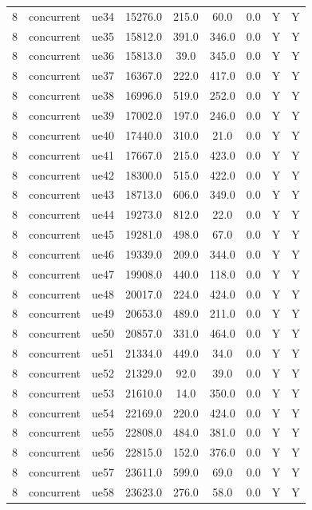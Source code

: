 \begin{table}[ht]
\begin{tabular}{|c|c|c|c|c|c|c|c|c|}
8 & concurrent & ue34 & 15276.0 & 215.0 & 60.0 & 0.0 & Y & Y \\
8 & concurrent & ue35 & 15812.0 & 391.0 & 346.0 & 0.0 & Y & Y \\
8 & concurrent & ue36 & 15813.0 & 39.0 & 345.0 & 0.0 & Y & Y \\
8 & concurrent & ue37 & 16367.0 & 222.0 & 417.0 & 0.0 & Y & Y \\
8 & concurrent & ue38 & 16996.0 & 519.0 & 252.0 & 0.0 & Y & Y \\
8 & concurrent & ue39 & 17002.0 & 197.0 & 246.0 & 0.0 & Y & Y \\
8 & concurrent & ue40 & 17440.0 & 310.0 & 21.0 & 0.0 & Y & Y \\
8 & concurrent & ue41 & 17667.0 & 215.0 & 423.0 & 0.0 & Y & Y \\
8 & concurrent & ue42 & 18300.0 & 515.0 & 422.0 & 0.0 & Y & Y \\
8 & concurrent & ue43 & 18713.0 & 606.0 & 349.0 & 0.0 & Y & Y \\
8 & concurrent & ue44 & 19273.0 & 812.0 & 22.0 & 0.0 & Y & Y \\
8 & concurrent & ue45 & 19281.0 & 498.0 & 67.0 & 0.0 & Y & Y \\
8 & concurrent & ue46 & 19339.0 & 209.0 & 344.0 & 0.0 & Y & Y \\
8 & concurrent & ue47 & 19908.0 & 440.0 & 118.0 & 0.0 & Y & Y \\
8 & concurrent & ue48 & 20017.0 & 224.0 & 424.0 & 0.0 & Y & Y \\
8 & concurrent & ue49 & 20653.0 & 489.0 & 211.0 & 0.0 & Y & Y \\
8 & concurrent & ue50 & 20857.0 & 331.0 & 464.0 & 0.0 & Y & Y \\
8 & concurrent & ue51 & 21334.0 & 449.0 & 34.0 & 0.0 & Y & Y \\
8 & concurrent & ue52 & 21329.0 & 92.0 & 39.0 & 0.0 & Y & Y \\
8 & concurrent & ue53 & 21610.0 & 14.0 & 350.0 & 0.0 & Y & Y \\
8 & concurrent & ue54 & 22169.0 & 220.0 & 424.0 & 0.0 & Y & Y \\
8 & concurrent & ue55 & 22808.0 & 484.0 & 381.0 & 0.0 & Y & Y \\
8 & concurrent & ue56 & 22815.0 & 152.0 & 376.0 & 0.0 & Y & Y \\
8 & concurrent & ue57 & 23611.0 & 599.0 & 69.0 & 0.0 & Y & Y \\
8 & concurrent & ue58 & 23623.0 & 276.0 & 58.0 & 0.0 & Y & Y \\

\end{tabular}
\end{table}
